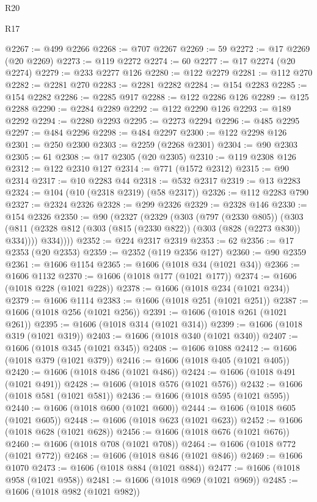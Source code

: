 \begin{lexlean}{R20}
\begin{lexlean}{R17}
\begin{coremodule}
{{{{{{{{{{{{{{{{{{{{{{{{{{{{{{{{{{{{{{{{{{{{{{{{{{{{{{{{{{{{{{{{{{{{{{{{{{{{{{{{{{{{{{{{{{{{{{{{{{{{{{{{{{{@2267 := @499 @2266
@2268 := @707 @2267
@2269 := 59
@2272 := @17 @2269 (@20 @2269)
@2273 := @119 @2272
@2274 := 60
@2277 := @17 @2274 (@20 @2274)
@2279 := @233 @2277 @126
@2280 := @122 @2279
@2281 := @112 @270
@2282 := @2281 @270
@2283 := @2281 @2282
@2284 := @154 @2283
@2285 := @154 @2282
@2286 := @2285 @917
@2288 := @122 @2286 @126
@2289 := @125 @2288
@2290 := @2284 @2289
@2292 := @122 @2290 @126
@2293 := @189 @2292
@2294 := @2280 @2293
@2295 := @2273 @2294
@2296 := @485 @2295
@2297 := @484 @2296
@2298 := @484 @2297
@2300 := @122 @2298 @126
@2301 := @250 @2300
@2303 := @2259 (@2268 @2301)
@2304 := @90 @2303
@2305 := 61
@2308 := @17 @2305 (@20 @2305)
@2310 := @119 @2308 @126
@2312 := @122 @2310 @127
@2314 := @771 (@1572 @2312)
@2315 := @90 @2314
@2317 := @10 @2283 @44
@2318 := @532 @2317
@2319 := @13 @2283
@2324 := @104 (@10 (@2318 @2319) (@58 @2317))
@2326 := @112 @2283 @790
@2327 := @2324 @2326
@2328 := @299 @2326
@2329 := @2328 @146
@2330 := @154 @2326
@2350 := @90
    (@2327
      (@2329
        (@303
          (@797 (@2330 @805))
          (@303
            (@811 (@2328 @812 (@303 (@815 (@2330 @822)) (@303 (@828 (@2273 @830)) @334))))
            @334))))
@2352 := @224 @2317 @2319
@2353 := 62
@2356 := @17 @2353 (@20 @2353)
@2359 := @2352 (@119 @2356 @127)
@2360 := @90 @2359
@2361 := @1606 @1154
@2365 := @1606 (@1018 @34 (@1021 @34))
@2366 := @1606 @1132
@2370 := @1606 (@1018 @177 (@1021 @177))
@2374 := @1606 (@1018 @228 (@1021 @228))
@2378 := @1606 (@1018 @234 (@1021 @234))
@2379 := @1606 @1114
@2383 := @1606 (@1018 @251 (@1021 @251))
@2387 := @1606 (@1018 @256 (@1021 @256))
@2391 := @1606 (@1018 @261 (@1021 @261))
@2395 := @1606 (@1018 @314 (@1021 @314))
@2399 := @1606 (@1018 @319 (@1021 @319))
@2403 := @1606 (@1018 @340 (@1021 @340))
@2407 := @1606 (@1018 @345 (@1021 @345))
@2408 := @1606 @1088
@2412 := @1606 (@1018 @379 (@1021 @379))
@2416 := @1606 (@1018 @405 (@1021 @405))
@2420 := @1606 (@1018 @486 (@1021 @486))
@2424 := @1606 (@1018 @491 (@1021 @491))
@2428 := @1606 (@1018 @576 (@1021 @576))
@2432 := @1606 (@1018 @581 (@1021 @581))
@2436 := @1606 (@1018 @595 (@1021 @595))
@2440 := @1606 (@1018 @600 (@1021 @600))
@2444 := @1606 (@1018 @605 (@1021 @605))
@2448 := @1606 (@1018 @623 (@1021 @623))
@2452 := @1606 (@1018 @628 (@1021 @628))
@2456 := @1606 (@1018 @676 (@1021 @676))
@2460 := @1606 (@1018 @708 (@1021 @708))
@2464 := @1606 (@1018 @772 (@1021 @772))
@2468 := @1606 (@1018 @846 (@1021 @846))
@2469 := @1606 @1070
@2473 := @1606 (@1018 @884 (@1021 @884))
@2477 := @1606 (@1018 @958 (@1021 @958))
@2481 := @1606 (@1018 @969 (@1021 @969))
@2485 := @1606 (@1018 @982 (@1021 @982))
}}}}}}}}}}}}}}}}}}}}}}}}}}}}}}}}}}}}}}}}}}}}}}}}}}}}}}}}}}}}}}}}}}}}}}}}}}}}}}}}}}}}}}}}}}}}}}}}}}}}}}}}}}}
\end{coremodule}
\end{lexlean}
\end{lexlean}

